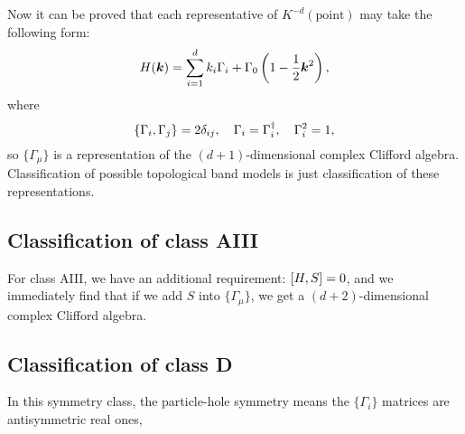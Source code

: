 \documentclass[hyperref, a4paper]{article}
\begin{document}
Now it can be proved that each representative of $K^{-d}(\text{point})$ may take the following form:
\begin{equation}
    H(\vb*{k}) = \sum_{i=1}^d k_i \Gamma_i + \Gamma_0 \left(1 - \frac{1}{2} \vb*{k}^2 \right),
\end{equation}
where 
\begin{equation}
    \acomm{\Gamma_i}{\Gamma_j} = 2 \delta_{ij}, \quad \Gamma_i = \Gamma_i^\dagger , \quad \Gamma_i^2 = 1,
\end{equation}
so $\{\Gamma_\mu \}$ is a representation of the $(d+1)$-dimensional complex Clifford algebra. Classification of 
possible topological band models is just classification of these representations.

\subsection{Classification of class AIII}

For class AIII, we have an additional requirement: $\comm{H}{S} = 0$, and we immediately find that 
if we add $S$ into $\{ \Gamma_\mu \}$, we get a $(d+2)$-dimensional complex Clifford algebra.

\subsection{Classification of class D}

In this symmetry class, the particle-hole symmetry means the $\{\Gamma_i\}$ matrices are antisymmetric real ones,
 



\end{document}
